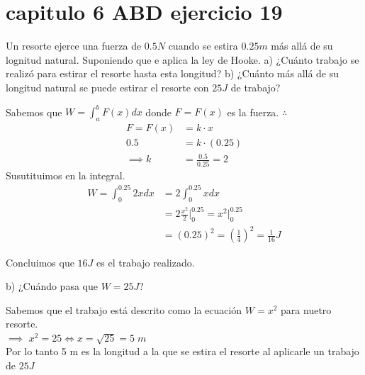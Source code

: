 \chapter*{capitulo 6 ABD ejercicio 19}
Un resorte ejerce una fuerza de $0.5N$ cuando se estira $0.25m$ más allá de su lognitud natural. Suponiendo que e aplica la ley de Hooke.
a) ¿Cuánto trabajo se realizó para estirar el resorte hasta esta longitud?
b) ¿Cuánto más allá de su longitud natural se puede estirar el resorte con $25J$ de trabajo?

Sabemos que $W=\displaystyle\int_{a}^{b}F(x)dx$
donde $F=F(x)$ es la fuerza.
$\therefore$
\begin{align*}
	F=F(x)&=k\cdot x\\
	0.5&=k\cdot (0.25)\\
    \implies k&=\frac{0.5}{0.25}=2
\end{align*}
Susutituimos en la integral.
\begin{align*}
    W=\int_{0}^{0.25}2xdx&=2\int_{0}^{0.25}xdx\\
&= 2\frac{x^2}{2}\bigg|_{0}^{0.25}=x^2\bigg|_{0}^{0.25}\\
&=(0.25)^2=(\frac{1}{4})^2=\frac{1}{16}J
\end{align*}

Concluimos que $16J$ es el trabajo realizado.

b) ¿Cuándo pasa que $W=25J$?

Sabemos que el trabajo está descrito como la ecuación $W=x^2$ para nuetro resorte.\\
$\implies$ $x^2=25\iff x=\sqrt{25}=5\;m$ \\
Por lo tanto 5 m es la longitud a la que se estira el resorte al aplicarle un trabajo de $25 J$
